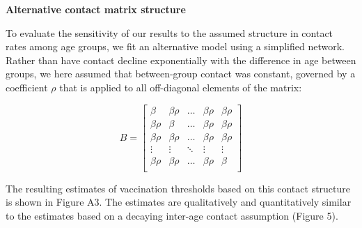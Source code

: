 \textbf{Alternative contact matrix structure}

To evaluate the sensitivity of our results to the assumed structure in contact rates among age groups, we fit an alternative model using a simplified network. Rather than have contact decline exponentially with the difference in age between groups, we here assumed that between-group contact was constant, governed by a coefficient $\rho$ that is applied to all off-diagonal elements of the matrix:

\begin{equation}
B = \left[{
\begin{array}{ccccc}
  {\beta} & {\beta \rho} & \ldots & {\beta \rho} & {\beta \rho}  \\
  {\beta \rho} & {\beta} & \ldots & {\beta \rho} & {\beta \rho} \\
{\beta \rho} & {\beta \rho} & \ldots & {\beta \rho} & {\beta \rho}  \\
  \vdots & \vdots & \ddots & \vdots & \vdots \\
  {\beta \rho} & {\beta \rho} & \ldots & {\beta \rho} & {\beta}  \\
\end{array}
}\right]
\end{equation}

The resulting estimates of vaccination thresholds based on this contact structure is shown in Figure A3. The estimates are qualitatively and quantitatively similar to the estimates based on a decaying inter-age contact assumption (Figure 5).